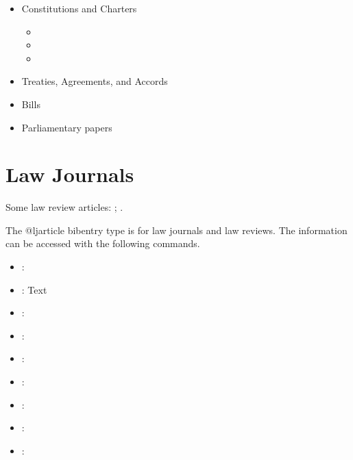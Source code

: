 \begin{itemize}
\item Constitutions and Charters
   \begin{itemize}
   \item \setstatjurison{}
   \item {}
   \item {}\setstatjurisoff
   \end{itemize}
\item Treaties, Agreements, and Accords
\item Bills
\item Parliamentary papers
\end{itemize}





\section{Law Journals}

\p Some law review articles: ; .

\p The @ljarticle bibentry type is for law journals and law reviews.
\p The information can be accessed with the following commands.
\begin{itemize}
\item{}: 

\item{}: Text

\item{}: 

\item{}: 

\item{}: 

\item{}: 

\item{}: 

\item{}: 

\item{}: 

\end{itemize}


